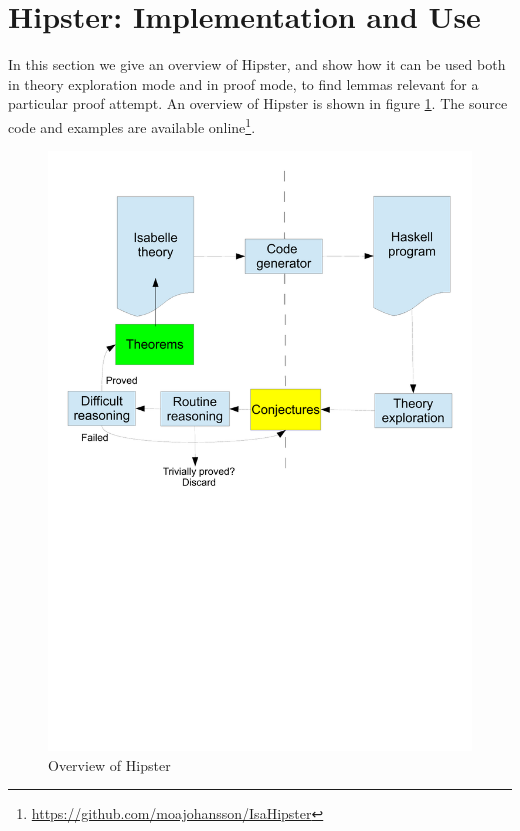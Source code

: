 \section{Hipster: Implementation and Use}
\label{sec:hipster}

In this section we give an overview of Hipster, and show how it can be used both in theory exploration mode and in proof mode, to find lemmas relevant for a particular proof attempt. An overview of Hipster is shown in figure \ref{fig:hipster}. The source code and examples are available online\footnote{\url{https://github.com/moajohansson/IsaHipster}}.

\begin{figure}[htbp]
\begin{center}
\includegraphics[scale=0.45]{hipster}

\caption{Overview of Hipster}
\label{fig:hipster}
\end{center}
\end{figure}

